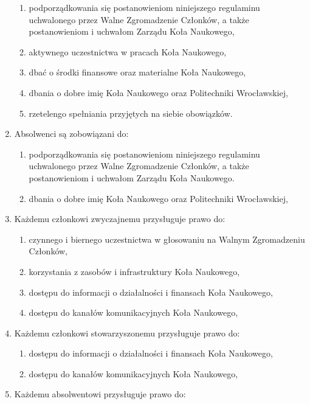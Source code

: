 \documentclass[12pt,a4paper]{article}
\begin{document}
\begin{enumerate}
\begin{enumerate}
                \item podporządkowania się postanowieniom niniejszego regulaminu uchwalonego przez Walne Zgromadzenie Członków, a także postanowieniom i uchwałom Zarządu Koła Naukowego,
                \item aktywnego uczestnictwa w pracach Koła Naukowego,
                \item dbać o środki finansowe oraz materialne Koła Naukowego,
                \item dbania o dobre imię Koła Naukowego oraz Politechniki Wrocławskiej,
                \item rzetelengo spełniania przyjętych na siebie obowiązków.
            \end{enumerate}
        \item Absolwenci są zobowiązani do:
            \begin{enumerate}
                \item podporządkowania się postanowieniom niniejszego regulaminu uchwalonego przez Walne Zgromadzenie Członków, a także postanowieniom i uchwałom Zarządu Koła Naukowego.
                \item dbania o dobre imię Koła Naukowego oraz Politechniki Wrocławskiej,
            \end{enumerate}
        \item Każdemu członkowi zwyczajnemu przysługuje prawo do:
            \begin{enumerate}
                \item czynnego i biernego uczestnictwa w głosowaniu na Walnym Zgromadzeniu Członków,
                \item korzystania z zasobów i infrastruktury Koła Naukowego,
                \item dostępu do informacji o działalności i finansach Koła Naukowego,
                \item dostępu do kanałów komunikacyjnych Koła Naukowego,
            \end{enumerate}
        \item Każdemu członkowi stowarzyszonemu przysługuje prawo do:
            \begin{enumerate}
                \item dostępu do informacji o działalności i finansach Koła Naukowego,
                \item dostępu do kanałów komunikacyjnych Koła Naukowego,
            \end{enumerate}
        \item Każdemu absolwentowi przysługuje prawo do:

\end{enumerate}
\end{document}

